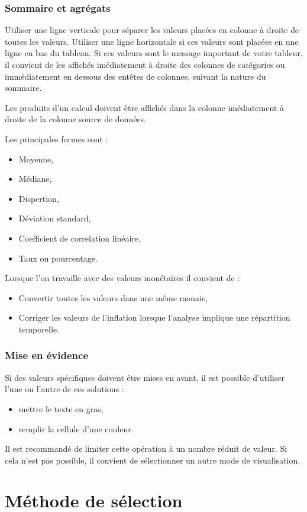 \documentclass[a4paper,12pt]{article}
\begin{document}
\begin{multicols}{2}
\subsubsection*{Sommaire et agrégats}
\label{sec:org2e6cb1f}
Utiliser une ligne verticale pour séparer les valeurs placées en colonne à droite de toutes les valeurs.
Utiliser une ligne horizontale si ces valeurs sont placées en une ligne en bas du tableau.
Si ces valeurs sont le message important de votre tableur, il convient de les affichés imédiatement à droite des colonnes de catégories ou immédiatement en dessous des entêtes de colonnes, suivant la nature du sommaire.

Les produits d'un calcul doivent être affichés dans la colonne imédiatement à droite de la colonne source de données.

Les principales formes sont :
\begin{itemize}
\item Moyenne,
\item Médiane,
\item Dispertion,
\item Déviation standard,
\item Coefficient de correlation linéaire,
\item Taux ou pourcentage.
\end{itemize}

Lorsque l'on travaille avec des valeurs monétaires il convient de :
\begin{itemize}
\item Convertir toutes les valeurs dans une même monaie,
\item Corriger les valeurs de l'inflation lorsque l'analyse implique une répartition temporelle.
\end{itemize}
\subsubsection*{Mise en évidence}
\label{sec:org81ebc64}
Si des valeurs spécifiques doivent être mises en avant, il est possible d'utiliser l'une ou l'autre de ces solutions :
\begin{itemize}
\item mettre le texte en gras,
\item remplir la cellule d'une couleur.
\end{itemize}
Il est recommandé de limiter cette opération à un nombre réduit de valeur. Si cela n'est pas possible, il convient de sélectionner un autre mode de visualisation.
\section*{Méthode de sélection}
\label{sec:org1727697}

\end{multicols}
\end{document}
